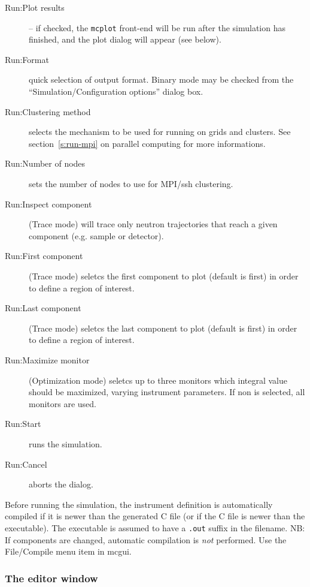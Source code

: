 \begin{description}
\item[Run:Plot results] -- if checked, the \verb+mcplot+ front-end will be run
  after the simulation has finished, and the plot dialog will appear
  (see below).
\item[Run:Format] quick selection of output format. Binary mode may be checked from the ``Simulation/Configuration options'' dialog box.
\item[Run:Clustering method] selects the mechanism to be used for running on grids and clusters.
  See section~\ref{s:run-mpi} on parallel computing for more informations.
\item[Run:Number of nodes] sets the number of nodes to use for MPI/ssh clustering.
\item[Run:Inspect component] (Trace mode) will trace only neutron trajectories that reach a given component (e.g. sample or detector).
\item[Run:First component] (Trace mode) seletcs the first component to plot (default is first) in order to define a region of interest.
\item[Run:Last component] (Trace mode) seletcs the last component to plot (default is first) in order to define a region of interest.
\item[Run:Maximize monitor] (Optimization mode) seletcs up to three monitors which integral value should be maximized, varying instrument parameters. If non is selected, all monitors are used.
\item[Run:Start] runs the simulation.
\item[Run:Cancel] aborts the dialog.
\end{description}

Before running the simulation, the instrument definition is
automatically compiled if it is newer than the generated C file (or if the C file
is newer than the executable). The executable is
assumed to have a \verb+.out+ suffix in the filename. NB: If
components are changed, automatic compilation is \emph{not}
performed. Use the File/Compile menu item in mcgui.



\subsubsection{The editor window}

